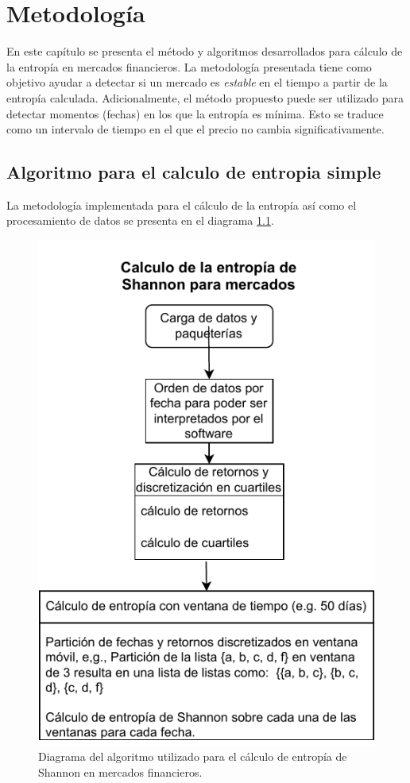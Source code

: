 %
\chapter{Metodología}
\label{Metodologia}

En este capítulo se presenta el método y algoritmos desarrollados para cálculo de la entropía en mercados financieros.
La metodología presentada tiene como objetivo ayudar a detectar si un mercado es \textit{estable} en el tiempo a partir de la entropía calculada.
Adicionalmente, el método propuesto puede ser utilizado para detectar momentos (fechas) en los que la entropía es mínima. 
Esto se traduce como un intervalo de tiempo en el que el precio no cambia significativamente.


\section{Algoritmo para el calculo de entropia simple}
\label{sec_algorithm}
La metodología implementada para el cálculo de la entropía así como el procesamiento de datos se presenta en el diagrama \ref{diagramaentropia1}.


\begin{figure}[h]
	\centering
	\includegraphics[width=0.7\linewidth]{figures/diagrama_entropia1}
	\caption{Diagrama del algoritmo utilizado para el c\'alculo de entrop\'ia de Shannon en mercados financieros.}
	\label{diagramaentropia1}
\end{figure}

